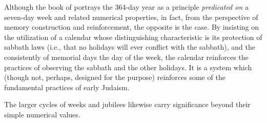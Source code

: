 Although the book of \jub portrays the 364-day year as a principle \emph{predicated on} a seven-day week and related numerical properties, in fact, from the perspective of memory construction and reinforcement, the opposite is the case. By insisting on the utilization of a calendar whose distinguishing characteristic is its protection of sabbath laws (i.e., that no holidays will ever conflict with the sabbath), and the consistently of memorial days \visavis the day of the week, the calendar reinforces the practices of observing the sabbath and the other holidays. It is a system which (though not, perhaps, designed for the purpose) reinforces some of the fundamental practices of early Judaism.

The larger cycles of weeks and jubilees likewise carry significance beyond their simple numerical values.



